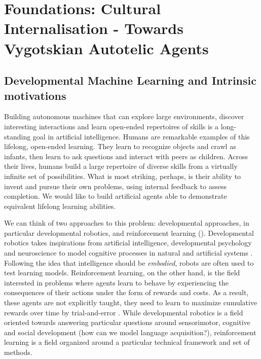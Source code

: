 \chapter{Foundations: Cultural Internalisation - Towards Vygotskian Autotelic Agents}

\minitoc

\section{Developmental Machine Learning and Intrinsic motivations}

Building autonomous machines that can explore large environments, discover interesting interactions and learn open-ended repertoires of skills is a long-standing goal in artificial intelligence. Humans are remarkable examples of this lifelong, open-ended learning. They learn to recognize objects and crawl as infants, then learn to ask questions and interact with peers as children. Across their lives, humans build a large repertoire of diverse skills from a virtually infinite set of possibilities. What is most striking, perhaps, is their ability to invent and pursue their own problems, using internal feedback to assess completion. We would like to build artificial agents able to demonstrate equivalent lifelong learning abilities.


We can think of two approaches to this problem: developmental approaches, in particular developmental robotics, and reinforcement learning (\rl). Developmental robotics takes inspirations from artificial intelligence, developmental psychology and neuroscience to model cognitive processes in natural and artificial systems \cite{asada2009cognitive,cangelosi2015developmental}. Following the idea that intelligence should be \textit{embodied}, robots are often used to test learning models. Reinforcement learning, on the other hand, is the field interested in problems where agents learn to behave by experiencing the consequences of their actions under the form of rewards and costs. As a result, these agents are not explicitly taught, they need to learn to maximize cumulative rewards over time by trial-and-error \cite{sutton2018reinforcement}. While developmental robotics is a field oriented towards answering particular questions around sensorimotor, cognitive and social development (\eg how can we model language acquisition?), reinforcement learning is a field organized around a particular technical framework and set of methods.


